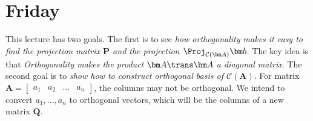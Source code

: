 

\section{Friday}
This lecture has two goals. The first is to see \emph{how orthogonality makes it easy to find the projection matrix $\bm P$ and the projection $\Proj_{\mathcal{C}(\bm A)}\bm b$}. The key idea is that \textit{Orthogonality makes the product $\bm A\trans\bm A$ a diagonal matrix}. The second goal is to \emph{show how to construct orthogonal basis of $\mathcal{C}(\bm A)$}. For matrix $\bm A=\begin{bmatrix}
a_1&a_2&\dots&a_n
\end{bmatrix}$, the columns may not be orthogonal. We intend to convert $a_1,\dots,a_n$ to orthogonal vectors, which will be the columns of a new matrix $\bm Q$.

